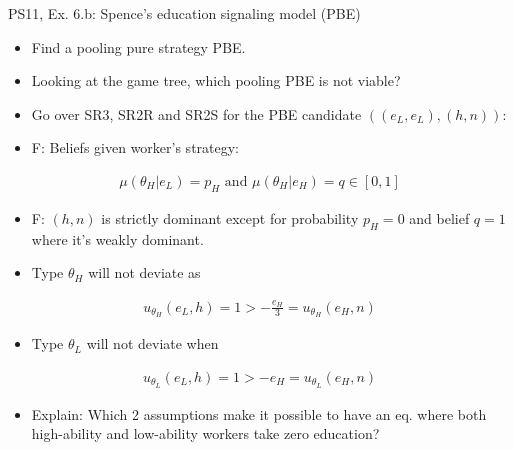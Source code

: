 \begin{frame}{PS11, Ex. 6.b: Spence’s education signaling model (PBE)}
    \begin{multicols}{2}
      \begin{itemize}
        \item[(b)] Find a pooling pure strategy PBE.
        \item[Step 1:] Looking at the game tree, which pooling PBE is not viable?
        \item[Step 2:] Go over SR3, SR2R and SR2S for the PBE candidate $((e_L,e_L),(h,n))$:
        \item[SR3:] F: Beliefs given worker's strategy:
      \end{itemize}\vspace{-10pt}
      \begin{align*}
        \mu(\theta_H|e_L)=p_H\text{ and }\mu(\theta_H|e_H)=q\in[0,1]
      \end{align*}\vspace{-20pt}
      \begin{itemize}
        \item[SR2R:] F: $(h,n)$ is strictly dominant except for probability $p_H=0$ and belief $q=1$ where it's weakly dominant.
        \item[SR2S:] Type $\theta_H$ will not deviate as
      \end{itemize}\vspace{-12pt}
      \begin{align*}
        u_{\theta_H}(e_L,h)=1>-\frac{e_H}{3}=u_{\theta_H}(e_H,n)
      \end{align*}\vspace{-20pt}
      \begin{itemize}
        \item[] Type $\theta_L$ will not deviate when
      \end{itemize}\vspace{-12pt}
      \begin{align*}
        u_{\theta_L}(e_L,h)=1>-e_H=u_{\theta_L}(e_H,n)
      \end{align*}\vspace{-20pt}
      \begin{itemize}
        \item[Step 3:] Explain: Which 2 assumptions make it possible to have an eq. where both high-ability and low-ability workers take zero education?
      \end{itemize}
      \vfill\null\columnbreak
      \begin{figure}[!h]

\end{figure}
\end{multicols}
\end{frame}
